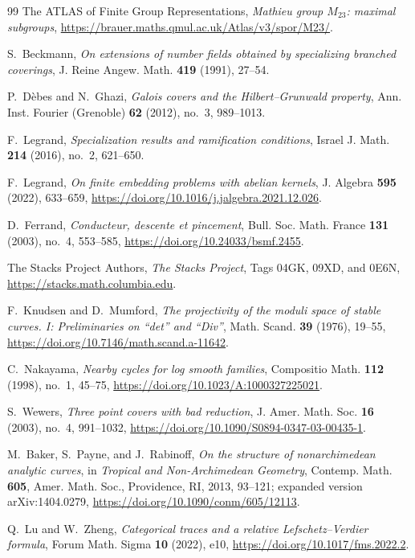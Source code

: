 \documentclass[11pt]{amsart}
\theoremstyle{definition}
\theoremstyle{remark}
\begin{document}
\begin{thebibliography}{99}
The ATLAS of Finite Group Representations,
\emph{Mathieu group $M_{23}$: maximal subgroups},
\url{https://brauer.maths.qmul.ac.uk/Atlas/v3/spor/M23/}.

S.~Beckmann,
\emph{On extensions of number fields obtained by specializing branched
coverings},
J. Reine Angew. Math. \textbf{419} (1991), 27--54.

P.~D\`ebes and N.~Ghazi,
\emph{Galois covers and the Hilbert--Grunwald property},
Ann. Inst. Fourier (Grenoble) \textbf{62} (2012), no.~3, 989--1013.

F.~Legrand,
\emph{Specialization results and ramification conditions},
Israel J. Math. \textbf{214} (2016), no.~2, 621--650.

F.~Legrand,
\emph{On finite embedding problems with abelian kernels},
J. Algebra \textbf{595} (2022), 633--659,
\url{https://doi.org/10.1016/j.jalgebra.2021.12.026}.

D.~Ferrand,
\emph{Conducteur, descente et pincement},
Bull. Soc. Math. France \textbf{131} (2003), no.~4, 553--585,
\url{https://doi.org/10.24033/bsmf.2455}.

The Stacks Project Authors,
\emph{The Stacks Project}, Tags 04GK, 09XD, and 0E6N,
\url{https://stacks.math.columbia.edu}.

F.~Knudsen and D.~Mumford,
\emph{The projectivity of the moduli space of stable curves. I:
Preliminaries on ``det'' and ``Div''},
Math. Scand. \textbf{39} (1976), 19--55,
\url{https://doi.org/10.7146/math.scand.a-11642}.

C.~Nakayama,
\emph{Nearby cycles for log smooth families},
Compositio Math. \textbf{112} (1998), no.~1, 45--75,
\url{https://doi.org/10.1023/A:1000327225021}.

S.~Wewers,
\emph{Three point covers with bad reduction},
J. Amer. Math. Soc. \textbf{16} (2003), no.~4, 991--1032,
\url{https://doi.org/10.1090/S0894-0347-03-00435-1}.

M.~Baker, S.~Payne, and J.~Rabinoff,
\emph{On the structure of nonarchimedean analytic curves},
in \emph{Tropical and Non-Archimedean Geometry},
Contemp. Math. \textbf{605}, Amer. Math. Soc., Providence, RI, 2013,
93--121; expanded version arXiv:1404.0279,
\url{https://doi.org/10.1090/conm/605/12113}.

Q.~Lu and W.~Zheng,
\emph{Categorical traces and a relative Lefschetz--Verdier formula},
Forum Math. Sigma \textbf{10} (2022), e10,
\url{https://doi.org/10.1017/fms.2022.2}.


\end{thebibliography}
\end{document}
